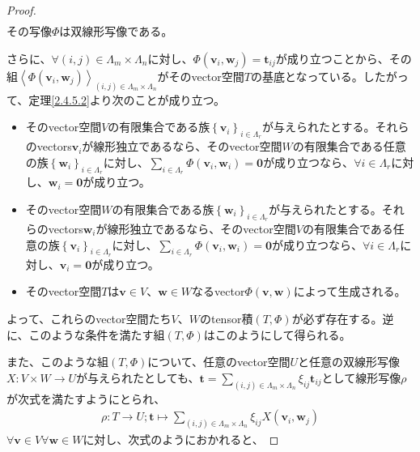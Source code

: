\documentclass[dvipdfmx]{jsarticle}
\begin{document}
\begin{proof}
\begin{align*}
\end{align*}
その写像$\varPhi$は双線形写像である。\par
さらに、$\forall(i,j) \in \varLambda_{m} \times \varLambda_{n}$に対し、$\varPhi\left( \mathbf{v}_{i},\mathbf{w}_{j} \right) = \mathbf{t}_{ij}$が成り立つことから、その組$\left\langle \varPhi\left( \mathbf{v}_{i},\mathbf{w}_{j} \right) \right\rangle_{(i,j) \in \varLambda_{m} \times \varLambda_{n}}$がそのvector空間$T$の基底となっている。したがって、定理\ref{2.4.5.2}より次のことが成り立つ。
\begin{itemize}
\item
  そのvector空間$V$の有限集合である族$\left\{ \mathbf{v}_{i} \right\}_{i \in \varLambda_{r}}$が与えられたとする。それらのvectors$\mathbf{v}_{i}$が線形独立であるなら、そのvector空間$W$の有限集合である任意の族$\left\{ \mathbf{w}_{i} \right\}_{i \in \varLambda_{r}}$に対し、$\sum_{i \in \varLambda_{r}} {\varPhi\left( \mathbf{v}_{i},\mathbf{w}_{i} \right)} = \mathbf{0}$が成り立つなら、$\forall i \in \varLambda_{r}$に対し、$\mathbf{w}_{i} = \mathbf{0}$が成り立つ。
\item
  そのvector空間$W$の有限集合である族$\left\{ \mathbf{w}_{i} \right\}_{i \in \varLambda_{r}}$が与えられたとする。それらのvectors$\mathbf{w}_{i}$が線形独立であるなら、そのvector空間$V$の有限集合である任意の族$\left\{ \mathbf{v}_{i} \right\}_{i \in \varLambda_{r}}$に対し、$\sum_{i \in \varLambda_{r}} {\varPhi\left( \mathbf{v}_{i},\mathbf{w}_{i} \right)} = \mathbf{0}$が成り立つなら、$\forall i \in \varLambda_{r}$に対し、$\mathbf{v}_{i} = \mathbf{0}$が成り立つ。
\item
  そのvector空間$T$は$\mathbf{v} \in V$、$\mathbf{w} \in W$なるvector$\varPhi\left( \mathbf{v},\mathbf{w} \right)$によって生成される。
\end{itemize}
よって、これらのvector空間たち$V$、$W$のtensor積$(T,\varPhi)$が必ず存在する。逆に、このような条件を満たす組$(T,\varPhi)$はこのようにして得られる。\par
また、このような組$(T,\varPhi)$について、任意のvector空間$U$と任意の双線形写像$X:V \times W \rightarrow U$が与えられたとしても、$\mathbf{t} = \sum_{(i,j) \in \varLambda_{m} \times \varLambda_{n}} {\xi_{ij}\mathbf{t}_{ij}}$として線形写像$\rho$が次式を満たすようにとられ、
\begin{align*}
\rho:T \rightarrow U;\mathbf{t} \mapsto \sum_{(i,j) \in \varLambda_{m} \times \varLambda_{n}} {\xi_{ij}X\left( \mathbf{v}_{i},\mathbf{w}_{j} \right)}
\end{align*}
$\forall\mathbf{v} \in V\forall\mathbf{w} \in W$に対し、次式のようにおかれると、

\end{proof}
\end{document}
